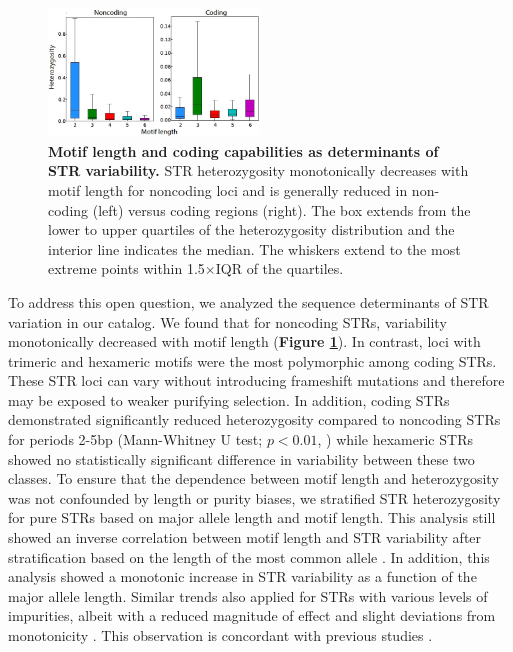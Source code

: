 \begin{figure}[h!]
\centering
\label{fig:catfig4}
\includegraphics[width=0.5\textwidth]{Figures/Chapter3/Fig4.jpg}
\caption{\textbf{Motif length and coding capabilities as determinants of STR variability.} STR heterozygosity monotonically decreases with motif length for noncoding loci and is generally reduced in non-coding (left) versus coding regions (right). The box extends from the lower to upper quartiles of the heterozygosity distribution and the interior line indicates the median. The whiskers extend to the most extreme points within 1.5$\times$IQR of the quartiles.}
\end{figure}

To address this open question, we analyzed the sequence determinants of STR variation in our catalog. We found that for noncoding STRs, variability monotonically decreased with motif length (\textbf{Figure \ref{fig:catfig4}}). In contrast, loci with trimeric and hexameric motifs were the most polymorphic among coding STRs. These STR loci can vary without introducing frameshift mutations and therefore may be exposed to weaker purifying selection. In addition, coding STRs demonstrated significantly reduced heterozygosity compared to noncoding STRs for periods 2-5bp (Mann-Whitney U test; $p < 0.01$, \cite{SuppWillemsGymrekHighnamEtAl2014}) while hexameric STRs showed no statistically significant difference in variability between these two classes. To ensure that the dependence between motif length and heterozygosity was not confounded by length or purity biases, we stratified STR heterozygosity for pure STRs based on major allele length and motif length. This analysis still showed an inverse correlation between motif length and STR variability after stratification based on the length of the most common allele \cite{SuppWillemsGymrekHighnamEtAl2014}. In addition, this analysis showed a monotonic increase in STR variability as a function of the major allele length. Similar trends also applied for STRs with various levels of impurities, albeit with a reduced magnitude of effect and slight deviations from monotonicity \cite{SuppWillemsGymrekHighnamEtAl2014}. This observation is concordant with previous studies \cite{Ellegren2000,LaiSun2003,WhittakerHarbordBoxallEtAl2003}.

